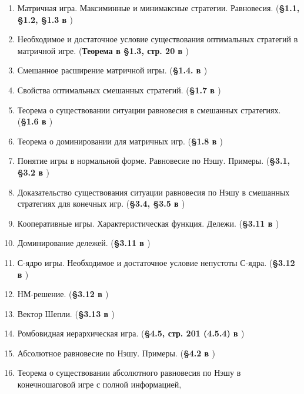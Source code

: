 \documentclass[a4paper,14pt]{extarticle}
\begin{document}


\newpage
\tableofcontents


\begin{enumerate}
    \item Матричная игра. Максиминные и минимаксные стратегии. Равновесия.
        (\textbf{\S 1.1, \S 1.2, \S 1.3 в \cite{gametheory-2012}})
    \item Необходимое и достаточное условие существования оптимальных стратегий в матричной игре.
        (\textbf{Теорема в \S 1.3, стр. 20 в \cite{gametheory-2012}})
    \item Смешанное расширение матричной игры.
        (\textbf{\S 1.4. в \cite{gametheory-2012}})
    \item Свойства оптимальных смешанных стратегий.
        (\textbf{\S 1.7 в \cite{gametheory-2012}})
    \item Теорема о существовании ситуации равновесия в смешанных стратегиях.
        (\textbf{\S 1.6 в \cite{gametheory-2012}})
    \item Теорема о доминировании для матричных игр.
        (\textbf{\S 1.8 в \cite{gametheory-2012}})
    \item Понятие игры в нормальной форме. Равновесие по Нэшу. Примеры.
        (\textbf{\S 3.1, \S 3.2 в \cite{gametheory-2012}})
    \item Доказательство существования ситуации равновесия по Нэшу в смешанных стратегиях для конечных игр.
        (\textbf{\S 3.4, \S 3.5 в \cite{gametheory-2012}})
    \item Кооперативные игры. Характеристическая функция. Дележи.
        (\textbf{\S 3.11 в \cite{gametheory-2012}})
    \item Доминирование дележей.
        (\textbf{\S 3.11 в \cite{gametheory-2012}})
    \item С-ядро игры. Необходимое и достаточное условие непустоты С-ядра.
        (\textbf{\S 3.12 в \cite{gametheory-2012}})
    \item НМ-решение.
        (\textbf{\S 3.12 в \cite{gametheory-2012}})
    \item Вектор Шепли.
        (\textbf{\S 3.13 в \cite{gametheory-2012}})
    \item Ромбовидная иерархическая игра.
        (\textbf{\S 4.5, стр. 201 (4.5.4) в \cite{gametheory-2012}})
    \item Абсолютное равновесие по Нэшу. Примеры.
        (\textbf{\S 4.2 в \cite{gametheory-2012}})
    \item Теорема о существовании абсолютного равновесия по Нэшу в конечношаговой игре с полной информацией,

\end{enumerate}
\end{document}
